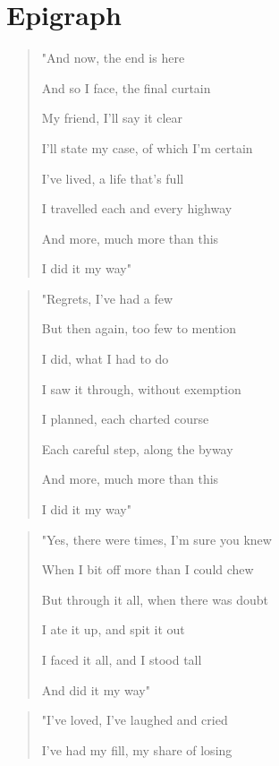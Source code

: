 \documentclass[11pt, oneside]{book}   	%
\begin{document}
\newpage
\thispagestyle{empty}
\mbox{}
\newpage

\newpage
\thispagestyle{empty}
\mbox{}
\newpage

\chapter{Epigraph}
\begin{small}
\begin{quote}
	"And now, the end is here

	And so I face, the final curtain

	My friend, I'll say it clear

	I'll state my case, of which I'm certain

	I've lived, a life that's full

	I travelled each and every highway

	And more, much more than this

	I did it my way"
\end{quote}

\pagebreak

\begin{quote}
	"Regrets, I've had a few

	But then again, too few to mention

	I did, what I had to do

	I saw it through, without exemption

	I planned, each charted course

	Each careful step, along the byway

	And more, much more than this

	I did it my way"
\end{quote}

\begin{quote}
	"Yes, there were times, I'm sure you knew

	When I bit off more than I could chew

	But through it all, when there was doubt

	I ate it up, and spit it out

	I faced it all, and I stood tall

	And did it my way"
\end{quote}

\begin{quote}	
	"I've loved, I've laughed and cried

	I've had my fill, my share of losing


\end{quote}
\end{small}
\end{document}
